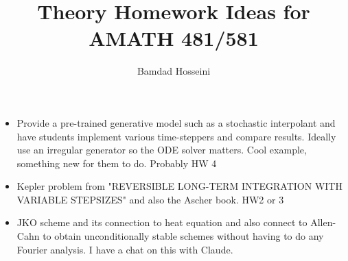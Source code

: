 \documentclass[11pt]{amsart}
\author{Bamdad Hosseini}
\title{Theory Homework Ideas for AMATH 481/581}
\begin{document}
\maketitle

\begin{itemize}
    \item Provide a pre-trained generative model such as a stochastic interpolant and have students implement various time-steppers and compare results. Ideally use an irregular generator so the ODE solver matters. Cool example, something new for them to do. Probably HW 4
    
    \item Kepler problem from "REVERSIBLE LONG-TERM INTEGRATION WITH VARIABLE
STEPSIZES" and also the Ascher book. HW2 or 3


    \item JKO scheme and its connection to heat equation and also connect to Allen-Cahn to 
    obtain unconditionally stable schemes without having to do any Fourier analysis. I have a chat on this with Claude. 



    
\end{itemize}
\end{document}
